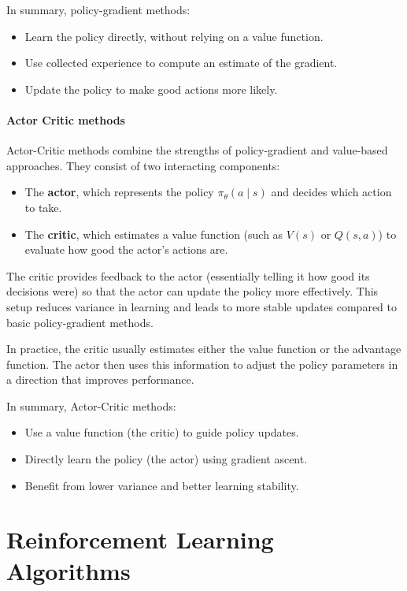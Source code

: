 In summary, policy-gradient methods:
\begin{itemize}
  \item Learn the policy directly, without relying on a value function.
  \item Use collected experience to compute an estimate of the gradient.
  \item Update the policy to make good actions more likely.
\end{itemize}

\paragraph{Actor Critic methods}

Actor-Critic methods combine the strengths of policy-gradient and value-based approaches. They consist of two interacting components:
\begin{itemize}
  \item The \textbf{actor}, which represents the policy $\pi_\theta(a \mid s)$ and decides which action to take.
  \item The \textbf{critic}, which estimates a value function (such as $V(s)$ or $Q(s, a)$) to evaluate how good the actor's actions are.
\end{itemize}

The critic provides feedback to the actor (essentially telling it how good its decisions were) so that the actor can update the policy more effectively. This setup reduces variance in learning and leads to more stable updates compared to basic policy-gradient methods.

In practice, the critic usually estimates either the value function or the advantage function. The actor then uses this information to adjust the policy parameters in a direction that improves performance.

In summary, Actor-Critic methods:
\begin{itemize}
  \item Use a value function (the critic) to guide policy updates.
  \item Directly learn the policy (the actor) using gradient ascent.
  \item Benefit from lower variance and better learning stability.
\end{itemize}

\section{Reinforcement Learning Algorithms}

